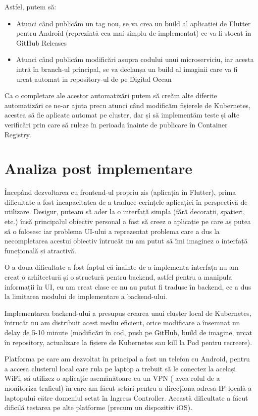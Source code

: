 Astfel, putem să:

\begin{itemize}
    \item Atunci când publicăm un tag nou, se va crea un build al aplicației de Flutter pentru Android
          (reprezintă cea mai simplu de implementat) ce va fi stocat în GitHub Releases
    \item Atunci când publicăm modificări asupra codului unui microserviciu, iar acesta intră în branch-ul principal,
          se va declanșa un build al imaginii care va fi urcat automat in repository-ul de pe Digital Ocean
\end{itemize}

Ca o completare ale acestor automatizări putem să creăm alte diferite automatizări ce ne-ar ajuta precu atunci când modificăm
fișierele de Kubernetes, acestea să fie aplicate automat pe cluster, dar și
să implementăm teste și alte verificări prin care să ruleze în perioada înainte de publicare în Container Registry.


\section{Analiza post implementare}

Începând dezvoltarea cu frontend-ul propriu zis (aplicația în Flutter), prima dificultate a fost
incapacitatea de a traduce cerințele aplicației în perspectivă de utilizare. Desigur, puteam să
ader la o interfață simpla (fără decorații, spațieri, etc.) însă principalul obiectiv personal
a fost să creez o aplicație pe care aș putea să o folosesc iar problema UI-ului a
reprezentat problema care a dus la necompletarea acestui obiectiv întrucât nu am putut
să îmi imaginez o interfață funcțională și atractivă.

O a doua dificultate a fost faptul că înainte de a implementa interfața nu am creat o arhitectură și
o structură pentru backend, astfel pentru a manipula informații în UI, eu am creat clase
ce nu au putut fi traduse în backend, ce a dus la limitarea modului de implementare a backend-ului.

Implementarea backend-ului a presupus crearea unui cluster local de Kubernetes,
întrucât nu am distribuit acest mediu eficient, orice modificare a însemnat un delay de 5-10 minute
(modificări în cod, push pe GitHub, build de imagine, urcat în repository, actualizare la fișiere
de Kubernetes sau kill la Pod pentru recreere).

Platforma pe care am dezvoltat în principal a fost un telefon cu Android, pentru a accesa clusterul local
care rula pe laptop a trebuit să le conectez la același WiFi, să utilizez o aplicație asemănătoare cu un VPN (
avea rolul de a monitoriza traficul) în care am făcut setări pentru a direcționa adresa IP locală a laptopului
către domeniul setat în Ingress Controller. Această dificultate a făcut dificilă testarea pe alte platforme (precum un dispozitiv iOS).

